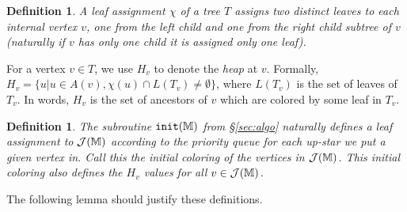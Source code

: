 \documentclass[11pt]{article}
\newtheorem{definition}[theorem]{Definition}
\theoremstyle{definition}
\newcommand{\cJ}{{\cal J}}
\newcommand{\MM}{\mathbb{M}}
\newcommand{\Sec}[1]{\hyperref[sec:#1]{\S\ref*{sec:#1}}} %
\newcommand{\Thm}[1]{\hyperref[thm:#1]{Theorem~\ref*{thm:#1}}} %
\newcommand{\Def}[1]{\hyperref[def:#1]{Definition~\ref*{def:#1}}} %
\newcommand{\init}{{\tt init}}
\newcommand{\pmax}{P_{\max}}
\begin{document}
\begin{definition}
\label{def:leafAssign}
 A \emph{leaf assignment} $\chi$ of a tree $T$ assigns \emph{two} distinct leaves to each internal vertex $v$,
 one from the left child and one from the right child subtree of $v$ (naturally if $v$ has only one child it is assigned 
 only one leaf).
\end{definition}

For a vertex $v\in T$, we use $H_v$ to denote the \emph{heap} at $v$.
Formally, $H_v = \{u | u \in A(v), \chi(u) \cap L(T_v) \neq \emptyset\}$, where $L(T_v)$ is the set of leaves of $T_v$.
In words, $H_v$ is the set of ancestors of $v$ which are colored by some leaf in $T_v$.


\begin{definition}
\label{def:initialColoring}
The subroutine $\init(\MM)$ from \Sec{algo} naturally defines a leaf assignment to $\cJ(\MM)$ 
according to the priority queue for each up-star we put a given vertex in.  Call this the \emph{initial coloring}
of the vertices in $\cJ(\MM)$.  This initial coloring also defines the $H_v$ values for all $v\in \cJ(\MM)$.
\end{definition}

The following lemma should justify these definitions.
\end{document}
